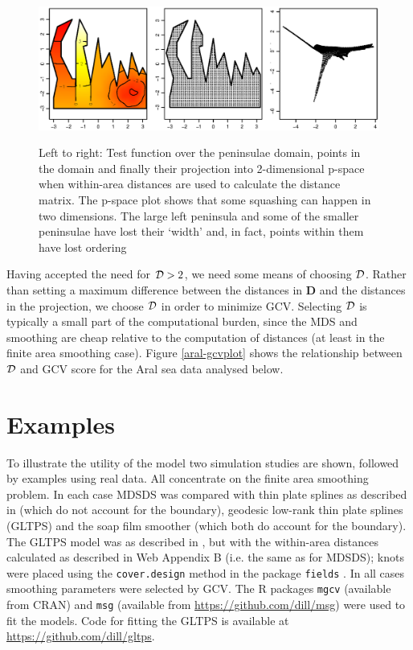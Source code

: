 \documentclass[smallextended]{svjour3}       %
\begin{document}
\begin{figure}
\centering
\includegraphics[width=\textwidth]{Fig3.eps} \\
\caption{Left to right: Test function over the peninsulae domain, points in the domain and finally their projection into 2-dimensional p-space when within-area distances are used to calculate the distance matrix. The p-space plot shows that some squashing can happen in two dimensions. The large left peninsula and some of the smaller peninsulae have lost their `width' and, in fact, points within them have lost ordering}
\label{wt2-plot}
\end{figure}

Having accepted the need for ${\cal D}>2$, we need some means of choosing $\cal D$. Rather than setting a maximum difference between the distances in $\mathbf{D}$ and the distances in the projection, we choose $\cal D$ in order to minimize GCV. Selecting $\cal D$ is typically a small part of the computational burden, since the MDS and smoothing are cheap relative to the computation of distances (at least in the finite area smoothing case). Figure \ref{aral-gcvplot} shows the relationship between $\cal D$ and GCV score for the Aral sea data analysed below. 


\section{Examples}
\label{examples}

To illustrate the utility of the model two simulation studies are shown, followed by examples using real data. All concentrate on the finite area smoothing problem. In each case MDSDS was compared with thin plate splines as described in \cite{Wood:2003tc} (which do not account for the boundary), geodesic low-rank thin plate splines (GLTPS) and the soap film smoother (which both do account for the boundary). The GLTPS model was as described in \cite{Wang:2007tf}, but with the within-area distances calculated as described in Web Appendix B (i.e. the same as for MDSDS); knots were placed using the \texttt{cover.design} method in the package \texttt{fields} \citep[again, as in][]{Wang:2007tf}. In all cases smoothing parameters were selected by GCV. The \textsf{R} packages \texttt{mgcv} (available from CRAN) and \texttt{msg} (available from \url{https://github.com/dill/msg}) were used to fit the models. Code for fitting the GLTPS is available at \url{https://github.com/dill/gltps}.
\end{document}
